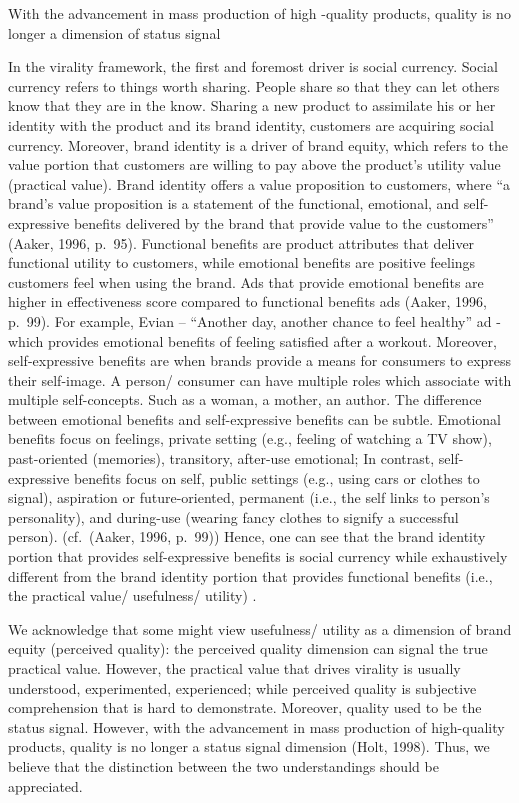 \documentclass[
]{book}
\begin{document}
With the advancement in mass production of high -quality products, quality is no longer a dimension of status signal \citep{Holt_1998}

In the virality framework, the first and foremost driver is social currency. Social currency refers to things worth sharing. People share so that they can let others know that they are in the know. Sharing a new product to assimilate his or her identity with the product and its brand identity, customers are acquiring social currency. Moreover, brand identity is a driver of brand equity, which refers to the value portion that customers are willing to pay above the product's utility value (practical value). Brand identity offers a value proposition to customers, where ``a brand's value proposition is a statement of the functional, emotional, and self-expressive benefits delivered by the brand that provide value to the customers'' (Aaker, 1996, p.~95). Functional benefits are product attributes that deliver functional utility to customers, while emotional benefits are positive feelings customers feel when using the brand. Ads that provide emotional benefits are higher in effectiveness score compared to functional benefits ads (Aaker, 1996, p.~99). For example, Evian -- ``Another day, another chance to feel healthy'' ad - which provides emotional benefits of feeling satisfied after a workout. Moreover, self-expressive benefits are when brands provide a means for consumers to express their self-image. A person/ consumer can have multiple roles which associate with multiple self-concepts. Such as a woman, a mother, an author. The difference between emotional benefits and self-expressive benefits can be subtle. Emotional benefits focus on feelings, private setting (e.g., feeling of watching a TV show), past-oriented (memories), transitory, after-use emotional; In contrast, self-expressive benefits focus on self, public settings (e.g., using cars or clothes to signal), aspiration or future-oriented, permanent (i.e., the self links to person's personality), and during-use (wearing fancy clothes to signify a successful person). (cf.~(Aaker, 1996, p.~99)) Hence, one can see that the brand identity portion that provides self-expressive benefits is social currency while exhaustively different from the brand identity portion that provides functional benefits (i.e., the practical value/ usefulness/ utility) .

We acknowledge that some might view usefulness/ utility as a dimension of brand equity (perceived quality): the perceived quality dimension can signal the true practical value. However, the practical value that drives virality is usually understood, experimented, experienced; while perceived quality is subjective comprehension that is hard to demonstrate. Moreover, quality used to be the status signal. However, with the advancement in mass production of high-quality products, quality is no longer a status signal dimension (Holt, 1998). Thus, we believe that the distinction between the two understandings should be appreciated.
\end{document}
